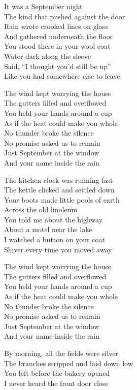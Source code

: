 \begin{lyrics}
It was a September night\\
The kind that pushed against the door\\
Rain wrote crooked lines on glass\\
And gathered underneath the floor\\
You stood there in your wool coat\\
Water dark along the sleeve\\
Said, “I thought you’d still be up”\\
Like you had somewhere else to leave

The wind kept worrying the house\\
The gutters filled and overflowed\\
You held your hands around a cup\\
As if the heat could make you whole\\
No thunder broke the silence\\
No promise asked us to remain\\
Just September at the window\\
And your name inside the rain

The kitchen clock was running fast\\
The kettle clicked and settled down\\
Your boots made little pools of earth\\
Across the old linoleum\\
You told me about the highway\\
About a motel near the lake\\
I watched a button on your coat\\
Shiver every time you moved away

The wind kept worrying the house\\
The gutters filled and overflowed\\
You held your hands around a cup\\
As if the heat could make you whole\\
No thunder broke the silence\\
No promise asked us to remain\\
Just September at the window\\
And your name inside the rain

By morning, all the fields were silver\\
The branches stripped and laid down low\\
You left before the bakery opened\\
I never heard the front door close


\end{lyrics}
